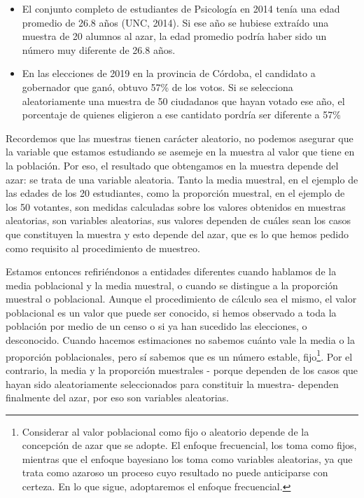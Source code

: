 \documentclass[]{book}
\providecommand{\tightlist}{%
  \setlength{\itemsep}{0pt}\setlength{\parskip}{0pt}}
\let\rmarkdownfootnote\footnote%
\def\footnote{\protect\rmarkdownfootnote}
\begin{document}
\begin{itemize}
\tightlist
\item
  El conjunto completo de estudiantes de Psicología en 2014 tenía una edad promedio de 26.8 años (UNC, 2014). Si ese año se hubiese extraído una muestra de 20 alumnos al azar, la edad promedio podría haber sido un número muy diferente de 26.8 años.
\item
  En las elecciones de 2019 en la provincia de Córdoba, el candidato a gobernador que ganó, obtuvo 57\% de los votos. Si se selecciona aleatoriamente una muestra de 50 ciudadanos que hayan votado ese año, el porcentaje de quienes eligieron a ese cantidato pordría ser diferente a 57\%
\end{itemize}

Recordemos que las muestras tienen carácter aleatorio, no podemos asegurar que la variable que estamos estudiando se asemeje en la muestra al valor que tiene en la población. Por eso, el resultado que obtengamos en la muestra depende del azar: se trata de una variable aleatoria. Tanto la media muestral, en el ejemplo de las edades de los 20 estudiantes, como la proporción muestral, en el ejemplo de los 50 votantes, son medidas calculadas sobre los valores obtenidos en muestras aleatorias, son variables aleatorias, sus valores dependen de cuáles sean los casos que constituyen la muestra y esto depende del azar, que es lo que hemos pedido como requisito al procedimiento de muestreo.

Estamos entonces refiriéndonos a entidades diferentes cuando hablamos de la media poblacional y la media muestral, o cuando se distingue a la proporción muestral o poblacional. Aunque el procedimiento de cálculo sea el mismo, el valor poblacional es un valor que puede ser conocido, si hemos observado a toda la población por medio de un censo o si ya han sucedido las elecciones, o desconocido. Cuando hacemos estimaciones no sabemos cuánto vale la media o la proporción poblacionales, pero sí sabemos que es un número estable, fijo\footnote{Considerar al valor poblacional como fijo o aleatorio depende de la concepción de azar que se adopte. El enfoque frecuencial, los toma como fijos, mientras que el enfoque bayesiano los toma como variables aleatorias, ya que trata como azaroso un proceso cuyo resultado no puede anticiparse con certeza. En lo que sigue, adoptaremos el enfoque frecuencial.}.
Por el contrario, la media y la proporción muestrales - porque dependen de los casos que hayan sido aleatoriamente seleccionados para constituir la muestra- dependen finalmente del azar, por eso son variables aleatorias.
\end{document}
